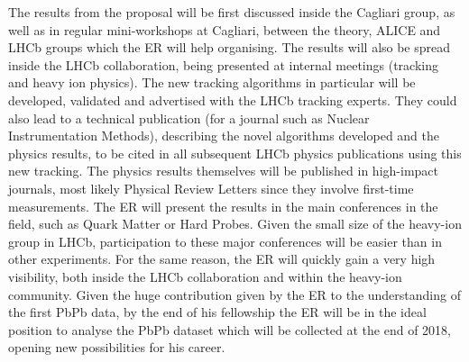 \documentclass[a4paper,11pt]{article}
\newcommand{\ER}{ER\xspace}
\begin{document}
% 


The results from the proposal will be first discussed inside the
Cagliari group, as well as in regular mini-workshops at Cagliari, 
between the theory, ALICE and LHCb groups which the \ER will
help organising. The results will also be
spread inside the LHCb collaboration, being presented at internal
meetings (tracking and heavy ion physics). The new tracking algorithms
in particular will be developed, validated and advertised with the
LHCb tracking experts. They could also lead to a technical publication
(for a journal such as Nuclear Instrumentation Methods), describing
the novel algorithms developed and the physics results, to be cited in all subsequent LHCb
physics publications using this new tracking. The physics results
themselves will be published in high-impact journals, most likely
Physical Review Letters since they involve first-time
measurements. The \ER will present the results in the main conferences in the
field, such as Quark Matter or Hard Probes. Given
the small size of the heavy-ion group in LHCb, participation to these
major conferences will be easier than in other experiments. For the
same reason, the \ER will quickly gain a very high visibility, both
inside the LHCb collaboration and within the heavy-ion community.
Given the huge contribution given by the \ER to the understanding of the 
first PbPb data, by the end of his fellowship the \ER will be in the 
ideal position to analyse the PbPb dataset which will be collected
at the end of 2018, opening new possibilities for his 
career. 
\end{document}
